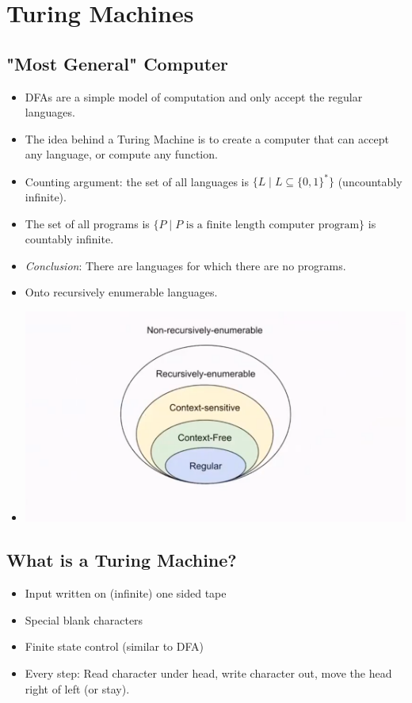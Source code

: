 \documentclass[12pt]{article}
\begin{document}
\section{Turing Machines}

\subsection{"Most General" Computer}
\begin{itemize}
    \item DFAs are a simple model of computation and only accept the regular languages.
    \item The idea behind a Turing Machine is to create a computer that can accept any language, or compute any function.
    \item Counting argument: the set of all languages is $\{ L \mid L \subseteq \{ 0, 1 \}^{\ast} \}$ (uncountably infinite).
    \item The set of all programs is $\{ P \mid P \text{ is a finite length computer program} \}$ is countably infinite.
    \item \textit{Conclusion}: There are languages for which there are no programs.
    \item Onto recursively enumerable languages.
    \item[] \includegraphics[width=\textwidth]{images/chomsky-hierarchy-context-sensitive.png}
\end{itemize}

\subsection{What is a Turing Machine?}
\begin{itemize}
    \item Input written on (infinite) one sided tape
    \item Special blank characters
    \item Finite state control (similar to DFA)
    \item Every step: Read character under head, write character out, move the head right of left (or stay).
\end{itemize}
\end{document}
